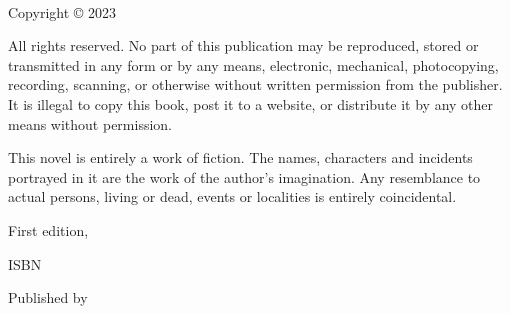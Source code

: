 
{\small
\setlength{\parindent}{0em}\setlength{\parskip}{1em}

~

\vfill

Copyright \copyright{} 2023 \authorname

All rights reserved. No part of this publication may be reproduced, stored or transmitted in any form or by any means, electronic, mechanical, photocopying, recording, scanning, or otherwise without written permission from the publisher. It is illegal to copy this book, post it to a website, or distribute it by any other means without permission.

This novel is entirely a work of fiction. The names, characters and incidents portrayed in it are the work of the author’s imagination. Any resemblance to actual persons, living or dead, events or localities is entirely coincidental.

First edition, \editionyear{}

ISBN \isbn{}  %

Published by \publisher{}
}
